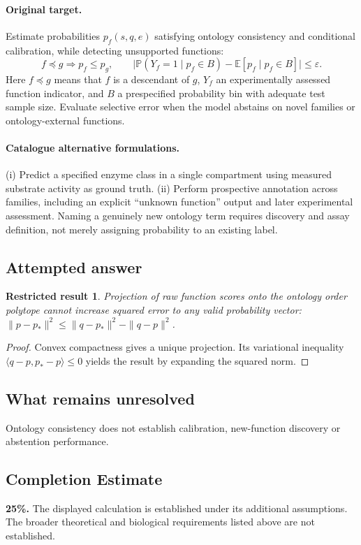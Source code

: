 \documentclass[11pt]{article}
\newcommand{\E}{\mathbb E}
\newcommand{\Prob}{\mathbb P}
\providecommand{\E}{\mathbb E}
\providecommand{\Prob}{\mathbb P}
\newtheorem{attemptresult}{Restricted result}[section]
\begin{document}
\paragraph{Original target.}
Estimate probabilities $p_f(s,q,e)$ satisfying ontology consistency and conditional calibration, while detecting unsupported functions:
\[f\preceq g\Longrightarrow p_f\le p_g,\qquad \big|\Prob(Y_f=1\mid p_f\in B)-\E[p_f\mid p_f\in B]\big|\le\varepsilon.\]
Here $f\preceq g$ means that $f$ is a descendant of $g$, $Y_f$ an experimentally assessed function indicator, and $B$ a prespecified probability bin with adequate test sample size. Evaluate selective error when the model abstains on novel families or ontology-external functions.
\paragraph{Catalogue alternative formulations.}
(i) Predict a specified enzyme class in a single compartment using measured substrate activity as ground truth. (ii) Perform prospective annotation across families, including an explicit ``unknown function'' output and later experimental assessment. Naming a genuinely new ontology term requires discovery and assay definition, not merely assigning probability to an existing label.
\subsection{Attempted answer}
\begin{attemptresult}
Projection of raw function scores onto the ontology order polytope cannot increase squared error to any valid probability vector: $\|p-p_*\|^2\leq\|q-p_*\|^2-\|q-p\|^2$.
\end{attemptresult}
\begin{proof}
Convex compactness gives a unique projection. Its variational inequality $\langle q-p,p_*-p\rangle\leq0$ yields the result by expanding the squared norm.
\end{proof}
\subsection{What remains unresolved}
Ontology consistency does not establish calibration, new-function discovery or abstention performance.
\subsection{Completion Estimate}
\textbf{25\%.} The displayed calculation is established under its additional assumptions. The broader theoretical and biological requirements listed above are not established.
\end{document}
